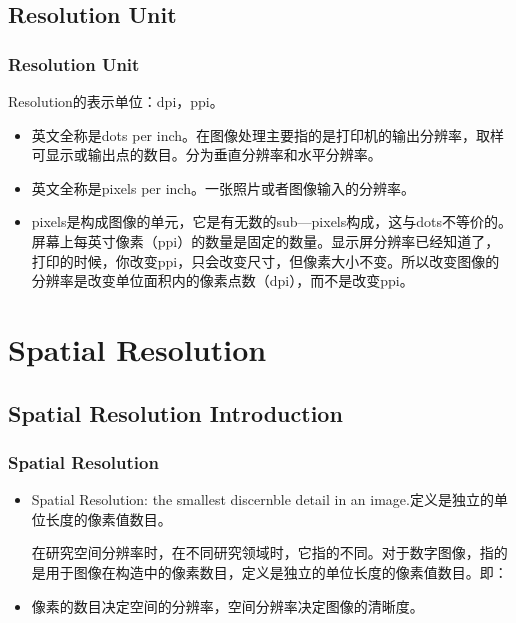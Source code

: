 \documentclass[notheorems,serif,table,compress]{beamer}  %
\begin{document}
 
\subsection{Resolution Unit}

\begin{frame}
\frametitle{Resolution Unit}
Resolution的表示单位：dpi，ppi。
    \begin{itemize}
        \item {}英文全称是dots per inch。在图像处理主要指的是打印机的输出分辨率，取样可显示或输出点的数目。分为垂直分辨率和水平分辨率。
        \item {}英文全称是pixels per inch。一张照片或者图像输入的分辨率。
       \item pixels是构成图像的单元，它是有无数的sub—pixels构成，这与dots不等价的。屏幕上每英寸像素（ppi）的数量是固定的数量。显示屏分辨率已经知道了，打印的时候，你改变ppi，只会改变尺寸，但像素大小不变。所以改变图像的分辨率是改变单位面积内的像素点数（dpi），而不是改变ppi。
    \end{itemize}
\end{frame}

\section {Spatial Resolution}
\subsection{Spatial Resolution Introduction}

\begin{frame}
\frametitle{Spatial Resolution}
 
    \begin{itemize}
        \item {\color{blue}Spatial Resolution:} the smallest discernble detail in an image.定义是独立的单位长度的像素值数目。
        
   在研究空间分辨率时，在不同研究领域时，它指的不同。对于数字图像，指的是用于图像在构造中的像素数目，定义是独立的单位长度的像素值数目。即：
 
     \item  像素的数目决定空间的分辨率，空间分辨率决定图像的清晰度。

    \end{itemize}
\end{frame}
\end{document}
